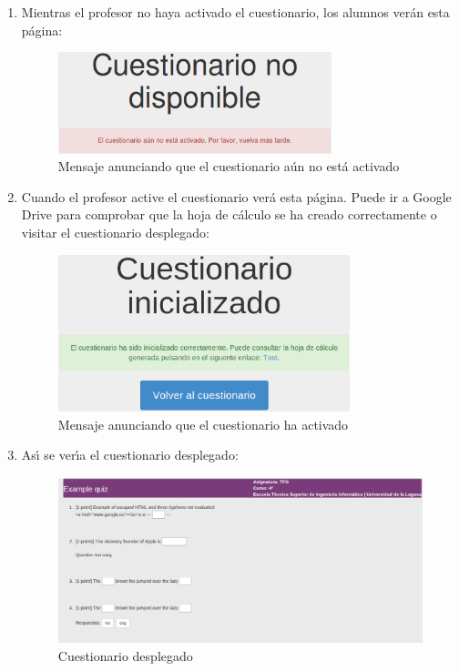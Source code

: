 \begin{enumerate}
  \item Mientras el profesor no haya activado el cuestionario, los alumnos ver\'an esta p\'agina:
  \begin{figure}[!th]
  \begin{center}
  \includegraphics[width=0.75\textwidth]{images/app6.eps}
  \caption{Mensaje anunciando que el cuestionario a\'un no est\'a activado}
  \label{fig:app6}
  \end{center}
  \end{figure}
  \newpage
  
  \item Cuando el profesor active el cuestionario ver\'a esta p\'agina. Puede ir a Google Drive para comprobar que la hoja de c\'alculo 
  se ha creado correctamente o visitar el cuestionario desplegado:
  \begin{figure}[!th]
  \begin{center}
  \includegraphics[width=0.8\textwidth]{images/app7.eps}
  \caption{Mensaje anunciando que el cuestionario ha activado}
  \label{fig:app7}
  \end{center}
  \end{figure}

  \item As\'{\i} se ver\'{\i}a el cuestionario desplegado:
  \begin{figure}[!th]
  \begin{center}
  \includegraphics[width=1\textwidth]{images/app8.eps}
  \caption{Cuestionario desplegado}
  \label{fig:app8}
  \end{center}
  \end{figure}
  \newpage
  

\end{enumerate}

